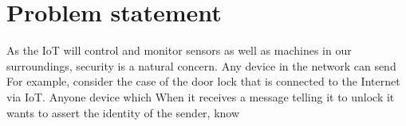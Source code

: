 \documentclass[final,letterpaper,twoside,12pt,twocolumn]{report}
\begin{document}

\section{Problem statement}
As the IoT will control and monitor sensors as well as machines in our surroundings, security is a natural concern. Any device in the network can send For example, consider the case of the door lock that is connected to the Internet via IoT. Anyone device which  When it receives a message telling it to unlock it wants to assert the identity of the sender, know 



					
\end{document}
